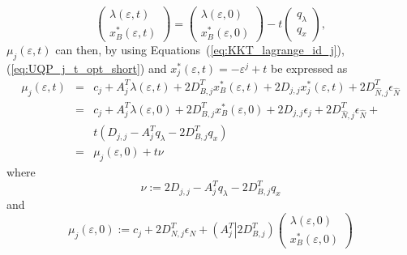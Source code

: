 \documentclass[a4paper]{article}
\begin{document}
\begin{equation}
\label{eq:UQP_j_t_opt_short}
\left(\begin{array}{c}
         \lambda\left(\varepsilon, t\right) \\
	 \hline
	 x_{B}^{*}\left(\varepsilon, t\right)
       \end{array}
\right)
=
\left(\begin{array}{c}
        \lambda\left(\varepsilon, 0\right) \\
	\hline
	x_{B}^{*}\left(\varepsilon, 0\right)
      \end{array}
\right)
-t
\left(\begin{array}{c}
         q_{\lambda} \\
	 \hline
	 q_{x}
       \end{array}
\right),
\end{equation}
$\mu_{j}\left(\varepsilon, t\right)$ can then, by using
Equations~(\ref{eq:KKT_lagrange_id_j}),(\ref{eq:UQP_j_t_opt_short}) and 
$x_{j}^{*}\left(\varepsilon, t\right)= -\varepsilon^{j} + t$ be
expressed as
\begin{eqnarray}
\label{eq:mu_j_eps_t}
\mu_{j}\left(\varepsilon, t\right) & = & c_{j} +
  A_{j}^{T}\lambda\left(\varepsilon, t\right)
  + 2D_{B,j}^{T}x_{B}^{*}\left(\varepsilon, t\right) +
  2D_{j,j}x_{j}^{*}\left(\varepsilon, t\right)
  + 2D_{\hat{N}, j}^{T}\epsilon_{\hat{N}} \nonumber \\
  & = & c_{j} + A_{j}^{T}\lambda\left(\varepsilon, 0\right)
  + 2D_{B,j}^{T}x_{B}^{*}\left(\varepsilon, 0\right) +
  2D_{j,j}\epsilon_{j}
  + 2D_{\hat{N}, j}^{T}\epsilon_{\hat{N}} + \nonumber \\
  & & t\left(D_{j,j} - A_{j}^{T}q_{\lambda} - 2D_{B,j}^{T}q_{x}
  \right) \\
  & = & \mu_{j}\left(\varepsilon, 0\right) + t\nu
  \nonumber   
\end{eqnarray}
where
\begin{equation}
\label{def:nu}
\nu := 2D_{j,j} - A_{j}^{T}q_{\lambda} - 2D_{B,j}^{T}q_{x}
\end{equation}
and
\begin{equation}
\mu_{j}\left(\varepsilon, 0\right) :=
c_{j} + 2D_{N, j}^{T}\epsilon_{N} +
\left(A_{j}^{T} \left|\right. 2D_{B, j}^{T} \right)
\left(\begin{array}{c}
        \lambda\left(\varepsilon, 0\right) \\
	\hline
	x_{B}^{*}\left(\varepsilon, 0\right)
       \end{array}
\right) 
\end{equation}
\end{document}
